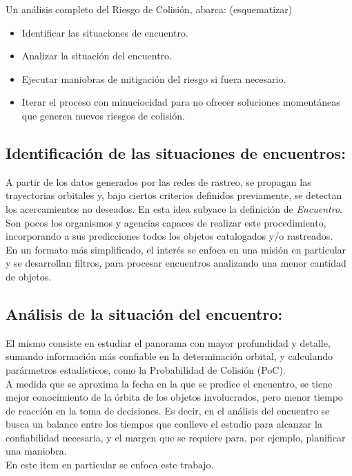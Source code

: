 {Un an\'alisis completo del Riesgo de Colisi\'on, abarca: (esquematizar)

\begin{itemize}
\item Identificar las situaciones de encuentro.
\item Analizar la situaci\'on del encuentro.
\item Ejecutar maniobras de mitigaci\'on del riesgo si fuera necesario.
\item Iterar el proceso con minuciocidad para no ofrecer soluciones moment\'aneas que generen nuevos riesgos de colisi\'on.
\end{itemize}

\subsection*{Identificaci\'on de las situaciones de encuentros:}
A partir de los datos generados por las redes de rastreo, se propagan las trayectorias orbitales y, bajo ciertos criterios definidos previamente, se detectan los acercamientos no deseados. En esta idea subyace la definici\'on de {\it{Encuentro}}.\\
Son pocos los organismos y agencias capaces de realizar este procedimiento, incorporando a sus predicciones todos los objetos catalogados y/o rastreados.\\
En un formato m\'as simplificado, el inter\'es se enfoca en una misi\'on en particular y se desarrollan filtros, para procesar encuentros analizando una menor cantidad de objetos.\\


\subsection*{An\'alisis de la situaci\'on del encuentro: }
El mismo consiste en estudiar el panorama con mayor profundidad y detalle, sumando informaci\'on m\'as confiable en la determinaci\'on orbital, y calculando par\'armetros estad\'isticos, como la Probabilidad de Colisi\'on (PoC).\\
A medida que se aproxima la fecha en la que se predice el encuentro, se tiene mejor conocimiento de la \'orbita de los objetos involucrados, pero menor tiempo de reacci\'on en la toma de decisiones. Es decir, en el an\'alisis del encuentro se busca un balance entre los tiempos que conlleve el estudio para alcanzar la confiabilidad necesaria, y el margen que se requiere para, por ejemplo, planificar una maniobra.\\
En este item en particular se enfoca este trabajo.\\

}
